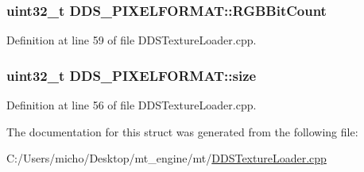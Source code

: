 \subsubsection[{\texorpdfstring{R\+G\+B\+Bit\+Count}{RGBBitCount}}]{\setlength{\rightskip}{0pt plus 5cm}uint32\+\_\+t D\+D\+S\+\_\+\+P\+I\+X\+E\+L\+F\+O\+R\+M\+A\+T\+::\+R\+G\+B\+Bit\+Count}\hypertarget{struct_d_d_s___p_i_x_e_l_f_o_r_m_a_t_af53071b3c2912f56e4b54533d8101951_af53071b3c2912f56e4b54533d8101951}{}\label{struct_d_d_s___p_i_x_e_l_f_o_r_m_a_t_af53071b3c2912f56e4b54533d8101951_af53071b3c2912f56e4b54533d8101951}


Definition at line 59 of file D\+D\+S\+Texture\+Loader.\+cpp.

\subsubsection[{\texorpdfstring{size}{size}}]{\setlength{\rightskip}{0pt plus 5cm}uint32\+\_\+t D\+D\+S\+\_\+\+P\+I\+X\+E\+L\+F\+O\+R\+M\+A\+T\+::size}\hypertarget{struct_d_d_s___p_i_x_e_l_f_o_r_m_a_t_adb357eb46848e57b8d89b59d31608f6c_adb357eb46848e57b8d89b59d31608f6c}{}\label{struct_d_d_s___p_i_x_e_l_f_o_r_m_a_t_adb357eb46848e57b8d89b59d31608f6c_adb357eb46848e57b8d89b59d31608f6c}


Definition at line 56 of file D\+D\+S\+Texture\+Loader.\+cpp.



The documentation for this struct was generated from the following file\+:\begin{DoxyCompactItemize}
\item 
C\+:/\+Users/micho/\+Desktop/mt\+\_\+engine/mt/\hyperlink{_d_d_s_texture_loader_8cpp}{D\+D\+S\+Texture\+Loader.\+cpp}\end{DoxyCompactItemize}
